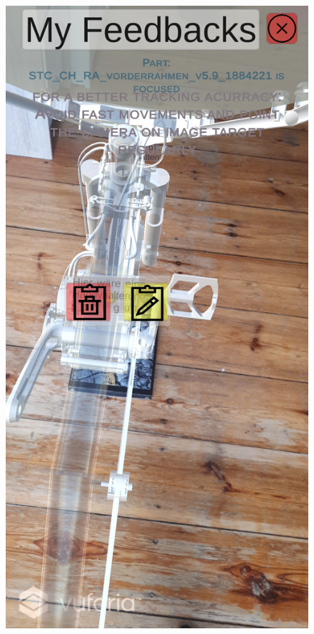\begin{figure}[H]
\begin{minipage}{.45\textwidth}
		\label{fig:listview}
	\end{minipage}%
	\begin{minipage}{.45\textwidth}
		\centering
		\includegraphics[width=.95\linewidth]{resources/implementation/annotationview.jpg}
		\label{fig:annotationview}
	\end{minipage}
\end{figure}

